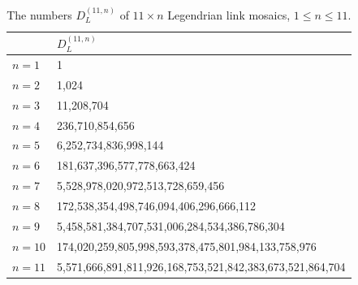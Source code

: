 \documentclass{article}
\begin{document}
\begin{table}[H]
\centering
\begin{tabular}{|l|l|}
\hline
& $D_L^{(11,n)}$                                                      \\ \hline
$n=1$                                                   & 1                                                         \\ \hline
$n=2$                                                & 1,024                                                     \\ \hline
$n=3$                                             & 11,208,704                                                \\ \hline
$n=4$                                & 236,710,854,656                                           \\ \hline
$n=5$                               & 6,252,734,836,998,144                                     \\ \hline
$n=6$                    & 181,637,396,577,778,663,424                               \\ \hline
$n=7$                  & 5,528,978,020,972,513,728,659,456                         \\ \hline
$n=8$           & 172,538,354,498,746,094,406,296,666,112                   \\ \hline
$n=9$         & 5,458,581,384,707,531,006,284,534,386,786,304             \\ \hline
$n=10$   &   174,020,259,805,998,593,378,475,801,984,133,758,976       \\ \hline
$n=11$    & 5,571,666,891,811,926,168,753,521,842,383,673,521,864,704 \\ \hline

\end{tabular}
\caption{The numbers $D_L^{(11,n)}$ of $11\times n$ Legendrian link mosaics, $1\leq n\leq 11$.}
\label{tab:11-mosaics}
\end{table}
\end{document}
